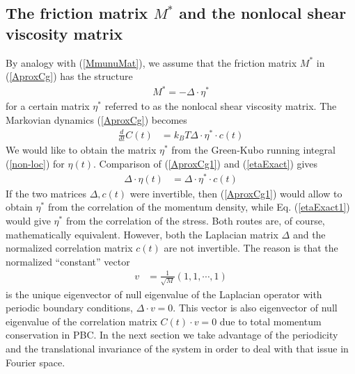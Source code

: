 \documentclass[a4paper,openright,12pt]{book}
\newcommand{\esc}{\!\cdot\!}
\begin{document}
\subsection{The  friction   matrix  $M^*$  and  the   nonlocal  shear
  viscosity matrix}
By analogy with  (\ref{MmunuMat}), we assume that the  friction matrix $M^*$ in
(\ref{AproxCg}) has the structure
\begin{align}
  M^*=-\Delta\esc \eta^*
\end{align}
for a  certain  matrix  $\eta^*$  referred to  as  the  nonlocal  shear
viscosity  matrix.  The Markovian  dynamics  (\ref{AproxCg})
becomes
\begin{align}
\frac{d}{dt}C(t)&=  k_BT\Delta\esc \eta^*\esc c(t)
\label{AproxCg1}
\end{align}
We  would like  to  obtain  the matrix  $\eta^*$  from the  Green-Kubo
running  integral   (\ref{non-loc})  for  $\eta(t)$.    Comparison  of
(\ref{AproxCg1}) and (\ref{etaExact}) gives
\begin{align}
 \Delta\esc \eta(t) &=\Delta\esc \eta^*\esc c(t)
\label{etaExact1}
\end{align}
If   the   two   matrices    $\Delta,c(t)$   were   invertible,   then
(\ref{AproxCg1}) would  allow to obtain $\eta^*$  from the correlation
of  the  momentum  density,  while Eq.  (\ref{etaExact1})  would  give
$\eta^*$  from the  correlation of  the  stress. Both  routes are,  of
course, mathematically equivalent.  However, both the Laplacian matrix
$\Delta$  and  the  normalized   correlation  matrix  $c(t)$  are  not
invertible.  The reason is that the normalized ``constant'' vector
\begin{align}
  v&=\frac{1}{\sqrt{M}}(1,1,\cdots,1)
\end{align}
is the unique eigenvector of null eigenvalue of the Laplacian operator
with periodic boundary conditions, $\Delta  \cdot v=0$. This vector is
also  eigenvector  of  null   eigenvalue  of  the  correlation  matrix
$C(t)\esc v=0$  due to total momentum  conservation in PBC. 
In the next section we take advantage of the periodicity and the translational invariance of the system in order to deal with that issue in Fourier space. 
\end{document}
